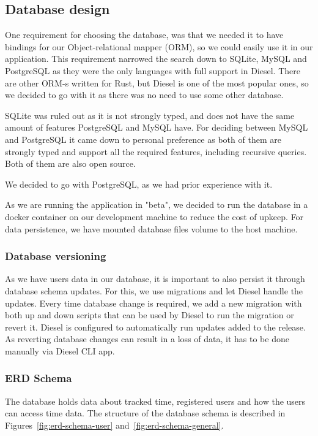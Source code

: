 \subsection{Database design}\label{subsec:database-design}
One requirement for choosing the database, was that we needed it to have bindings for our Object-relational mapper (ORM),
so we could easily use it in our application.
This requirement narrowed the search down to SQLite, MySQL and PostgreSQL as they were the only languages with full support in Diesel.
There are other ORM-s written for Rust, but Diesel is one of the most popular ones, so we decided to go with it as
there was no need to use some other database.

SQLite was ruled out as it is not strongly typed, and does not have the same amount of features PostgreSQL and MySQL have.
For deciding between MySQL and PostgreSQL it came down to personal preference as both of them are strongly typed and
support all the required features, including recursive queries.
Both of them are also open source.

We decided to go with PostgreSQL, as we had prior experience with it.

As we are running the application in "beta", we decided to run the database in a docker container on our development machine to
reduce the cost of upkeep.
For data persistence, we have mounted database files volume to the host machine.

\subsubsection{Database versioning}\label{subsubsec:database-versioning}
As we have users data in our database, it is important to also persist it through database schema updates.
For this, we use migrations and let Diesel handle the updates.
Every time database change is required, we add a new migration with both up and down scripts that can be used by Diesel
to run the migration or revert it.
Diesel is configured to automatically run updates added to the release.
As reverting database changes can result in a loss of data, it has to be done manually via Diesel CLI app.

\subsubsection{ERD Schema}\label{subsubsec:erd-schema}
The database holds data about tracked time, registered users and how the users can access time data.
The structure of the database schema is described in Figures~\ref{fig:erd-schema-user} and~\ref{fig:erd-schema-general}.


